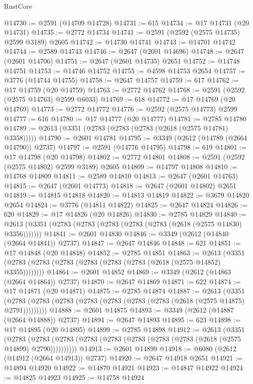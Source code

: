\begin{lexlean}{RustCore}
\begin{coremodule}
@14730 := @2591 (@14709 @14728)
@14731 := 615
@14734 := @17 @14731 (@20 @14731)
@14735 := @2772 @14734
@14741 := @2591 (@2592 (@2575 @14735) @2599 @3189) @2605
@14742 := @14730 @14741
@14743 := @14701 @14742
@14744 := @2589 @14743
@14746 := @2647 (@2601 @14696)
@14748 := @2647 (@2601 @14706)
@14751 := @2647 (@2601 @14735) @2651
@14752 := @14748 @14751
@14753 := @14746 @14752
@14755 := @4598 @14753 @2654
@14757 := @3776 (@14744 @14755)
@14758 := @2647 @14757
@14759 := 617
@14762 := @17 @14759 (@20 @14759)
@14763 := @2772 @14762
@14768 := @2591 (@2592 (@2575 @14763) @2599 @6033)
@14769 := 618
@14772 := @17 @14769 (@20 @14769)
@14773 := @2772 @14772
@14776 := @2592 (@2575 @14773) @2599
@14777 := 616
@14780 := @17 @14777 (@20 @14777)
@14781 := @2785 @14780
@14789 := @2613 (@3351 (@2783 (@2783 (@2783 (@2618 (@2575 @14781) @3358)))))
@14790 := @2601 @14781
@14795 := @3349 (@2612 (@14789 (@2664 @14790)) @2737)
@14797 := @2591 (@14776 @14795)
@14798 := 619
@14801 := @17 @14798 (@20 @14798)
@14802 := @2772 @14801
@14808 := @2591 (@2592 (@2575 @14802) @2599 @3189) @2605
@14809 := @14797 @14808
@14810 := @14768 @14809
@14811 := @2589 @14810
@14813 := @2647 (@2601 @14763)
@14815 := @2647 (@2601 @14773)
@14818 := @2647 (@2601 @14802) @2651
@14819 := @14815 @14818
@14820 := @14813 @14819
@14822 := @3679 @14820 @2654
@14824 := @3776 (@14811 @14822)
@14825 := @2647 @14824
@14826 := 620
@14829 := @17 @14826 (@20 @14826)
@14830 := @2785 @14829
@14840 := @2613 (@3351 (@2783 (@2783 (@2783 (@2783 (@2783 (@2618 (@2575 @14830) @3356)))))))
@14841 := @2601 @14830
@14846 := @3349 (@2612 (@14840 (@2664 @14841)) @2737)
@14847 := @2647 @14846
@14848 := 621
@14851 := @17 @14848 (@20 @14848)
@14852 := @2785 @14851
@14863 := @2613 (@3351 (@2783 (@2783 (@2783 (@2783 (@2783 (@2783 (@2618 (@2575 @14852) @3355))))))))
@14864 := @2601 @14852
@14869 := @3349 (@2612 (@14863 (@2664 @14864)) @2737)
@14870 := @2647 @14869
@14871 := 622
@14874 := @17 @14871 (@20 @14871)
@14875 := @2785 @14874
@14887 := @2613
    (@3351 (@2783 (@2783 (@2783 (@2783 (@2783 (@2783 (@2783 (@2618 (@2575 @14875) @2791)))))))))
@14888 := @2601 @14875
@14893 := @3349 (@2612 (@14887 (@2664 @14888)) @2737)
@14894 := @2647 @14893
@14895 := 623
@14898 := @17 @14895 (@20 @14895)
@14899 := @2785 @14898
@14912 := @2613
    (@3351
      (@2783 (@2783 (@2783 (@2783 (@2783 (@2783 (@2783 (@2783 (@2618 (@2575 @14899) @2790))))))))))
@14913 := @2601 @14899
@14918 := @6080 (@2612 (@14912 (@2664 @14913)) @2737)
@14920 := @2647 @14918 @2651
@14921 := @14894 @14920
@14922 := @14870 @14921
@14923 := @14847 @14922
@14924 := @14825 @14923
@14925 := @14758 @14924

\end{coremodule}
\end{lexlean}
